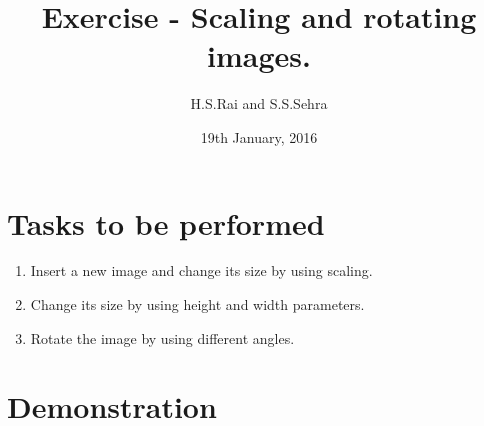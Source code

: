 \documentclass{article}
\title{Exercise  - Scaling and rotating images.}
\author{H.S.Rai and S.S.Sehra}
\date{19th January, 2016}
\begin{document}
	\maketitle	
	\section*{Tasks to be performed}
	\begin{enumerate}	
		\item Insert a new image and change its size by using scaling.
		\item Change its size by using height and width parameters.
		\item Rotate the image by using different angles.
		
		\end{enumerate}
	\section*{Demonstration}
	
\end{document}
